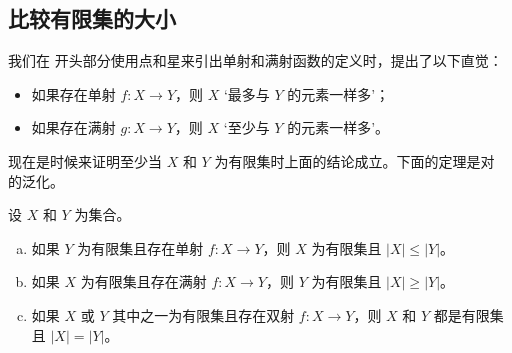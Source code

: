 \subsection*{比较有限集的大小}

我们在  开头部分使用点和星来引出单射和满射函数的定义时，提出了以下直觉：
\begin{itemize} 
\item 如果存在单射 $f : X \to Y$，则 $X$ `最多与 $Y$ 的元素一样多'；
\item 如果存在满射 $g : X \to Y$，则 $X$ `至少与 $Y$ 的元素一样多'。
\end{itemize}

现在是时候来证明至少当 $X$ 和 $Y$ 为有限集时上面的结论成立。下面的定理是对  的泛化。

\begin{theorem}
\label{thmFiniteSetsAndJections}
设 $X$ 和 $Y$ 为集合。
\begin{enumerate}[(a)]
\item 如果 $Y$ 为有限集且存在单射 $f : X \to Y$，则 $X$ 为有限集且 $|X| \le |Y|$。
\item 如果 $X$ 为有限集且存在满射 $f : X \to Y$，则 $Y$ 为有限集且 $|X| \ge |Y|$。
\item 如果 $X$ 或 $Y$ 其中之一为有限集且存在双射 $f : X \to Y$，则 $X$ 和 $Y$ 都是有限集且 $|X| = |Y|$。
\end{enumerate}
\end{theorem}

